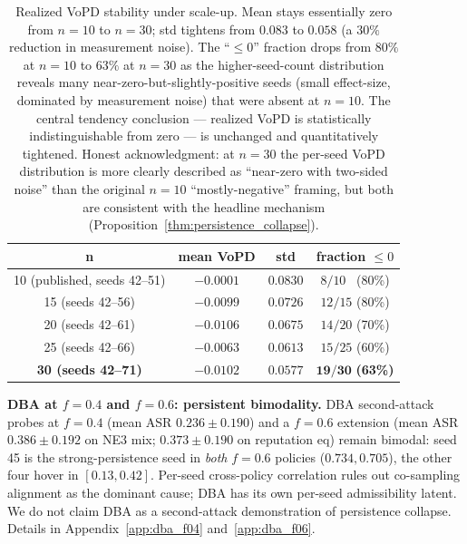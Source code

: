 \documentclass{article}
\begin{document}
\begin{table}[h]
\caption{Realized VoPD stability under scale-up. Mean stays essentially zero from $n{=}10$ to $n{=}30$; std tightens from $0.083$ to $0.058$ (a $30\%$ reduction in measurement noise). The ``$\leq 0$'' fraction drops from $80\%$ at $n{=}10$ to $63\%$ at $n{=}30$ as the higher-seed-count distribution reveals many near-zero-but-slightly-positive seeds (small effect-size, dominated by measurement noise) that were absent at $n{=}10$. The central tendency conclusion --- realized VoPD is statistically indistinguishable from zero --- is unchanged and quantitatively tightened. Honest acknowledgment: at $n{=}30$ the per-seed VoPD distribution is more clearly described as ``near-zero with two-sided noise'' than the original $n{=}10$ ``mostly-negative'' framing, but both are consistent with the headline mechanism (Proposition~\ref{thm:persistence_collapse}).}
\label{tab:30seed_stability}
\centering
\small
\begin{tabular}{c|ccc}
\toprule
\textbf{n} & \textbf{mean VoPD} & \textbf{std} & \textbf{fraction} $\leq 0$ \\
\midrule
10 (published, seeds 42--51) & $-0.0001$ & $0.0830$ & $8/10$ \ (80\%) \\
15 (seeds 42--56)           & $-0.0099$ & $0.0726$ & $12/15$ (80\%) \\
20 (seeds 42--61)           & $-0.0106$ & $0.0675$ & $14/20$ (70\%) \\
25 (seeds 42--66)           & $-0.0063$ & $0.0613$ & $15/25$ (60\%) \\
\textbf{30 (seeds 42--71)}  & $\mathbf{-0.0102}$ & $\mathbf{0.0577}$ & $\mathbf{19/30}$ \textbf{(63\%)} \\
\bottomrule
\end{tabular}
\end{table}

\textbf{DBA at $f{=}0.4$ and $f{=}0.6$: persistent bimodality.} DBA second-attack probes at $f{=}0.4$ (mean ASR $0.236 \pm 0.190$) and a $f{=}0.6$ extension (mean ASR $0.386 \pm 0.192$ on NE3 mix; $0.373 \pm 0.190$ on reputation eq) remain bimodal: seed 45 is the strong-persistence seed in \emph{both} $f{=}0.6$ policies ($0.734, 0.705$), the other four hover in $[0.13, 0.42]$. Per-seed cross-policy correlation rules out co-sampling alignment as the dominant cause; DBA has its own per-seed admissibility latent. We do not claim DBA as a second-attack demonstration of persistence collapse. Details in Appendix~\ref{app:dba_f04} and~\ref{app:dba_f06}.
\end{document}
